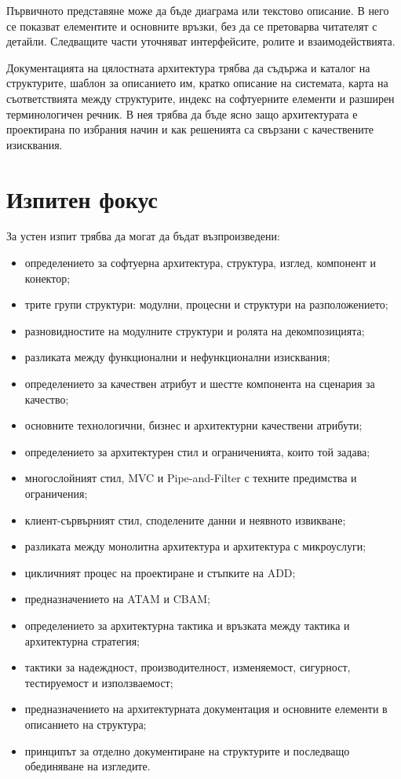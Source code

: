 Първичното представяне може да бъде диаграма или текстово описание. В него се показват елементите и основните връзки, без да се претоварва читателят с детайли. Следващите части уточняват интерфейсите, ролите и взаимодействията.

Документацията на цялостната архитектура трябва да съдържа и каталог на структурите, шаблон за описанието им, кратко описание на системата, карта на съответствията между структурите, индекс на софтуерните елементи и разширен терминологичен речник. В нея трябва да бъде ясно защо архитектурата е проектирана по избрания начин и как решенията са свързани с качествените изисквания.

\section{Изпитен фокус}\label{s:27.9}

За устен изпит трябва да могат да бъдат възпроизведени:

\begin{itemize}
    \item определението за софтуерна архитектура, структура, изглед, компонент и конектор;
    \item трите групи структури: модулни, процесни и структури на разположението;
    \item разновидностите на модулните структури и ролята на декомпозицията;
    \item разликата между функционални и нефункционални изисквания;
    \item определението за качествен атрибут и шестте компонента на сценария за качество;
    \item основните технологични, бизнес и архитектурни качествени атрибути;
    \item определението за архитектурен стил и ограниченията, които той задава;
    \item многослойният стил, MVC и Pipe-and-Filter с техните предимства и ограничения;
    \item клиент-сървърният стил, споделените данни и неявното извикване;
    \item разликата между монолитна архитектура и архитектура с микроуслуги;
    \item цикличният процес на проектиране и стъпките на ADD;
    \item предназначението на ATAM и CBAM;
    \item определението за архитектурна тактика и връзката между тактика и архитектурна стратегия;
    \item тактики за надеждност, производителност, изменяемост, сигурност, тестируемост и използваемост;
    \item предназначението на архитектурната документация и основните елементи в описанието на структура;
    \item принципът за отделно документиране на структурите и последващо обединяване на изгледите.
\end{itemize}

